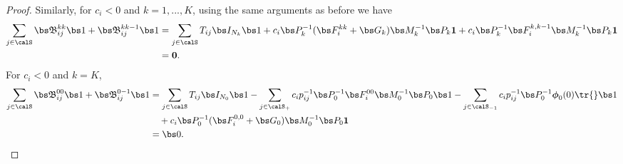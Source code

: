 \begin{proof}
		Similarly, for \(c_i<0\) and \(k=1,...,K\), using the same arguments as before we have
	\begin{align*}
		\sum_{j\in\calS}\mathfrak{\bs B}^{kk}_{ij}\bs 1 + \mathfrak{\bs B}^{kk-1}_{ij}\bs 1
		&=\sum_{j\in\calS}T_{ij}\bs I_{N_k}\bs 1 + c_i \bs P_k^{-1}(\bs F_i^{kk}+\bs G_k)\bs M_k^{-1}\bs P_k\boldsymbol 1 + c_i \bs P_k^{-1}\bs F_i^{k,k-1}\bs M_k^{-1}\bs P_k\boldsymbol 1
		\\&= \boldsymbol 0.
	\end{align*}
	For \(c_i<0\) and \(k=K\), 
	\begin{align*}
		\sum_{j\in\calS}\mathfrak{\bs B}^{00}_{ij}\bs 1 + \mathfrak{\bs B}^{0{-1}}_{ij}\bs 1
		&= \sum_{j\in\calS}T_{ij}\bs I_{N_0}\bs 1-\sum_{j\in\calS_+} c_ip_{ij}^{-1} \bs P_0^{-1}\bs F_i^{00}\bs M_0^{-1}\bs P_0 \bs 1 -\sum_{j\in\calS_{{-1} }}c_ip_{ij}^{-1} \bs P_0^{-1}\boldsymbol \phi_0(0)\tr{}\bs 1 
		\\&\quad{} + c_i \bs P_0^{-1}(\bs F_i^{0,0}+\bs G_0)\bs M_0^{-1}\bs P_0\boldsymbol 1 
		\\&= \bs 0.
	\end{align*}


\end{proof}
